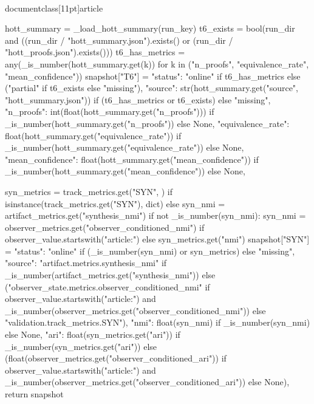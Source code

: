 \\documentclass[11pt]{article}
\begin{document}
\begin{CodeBlock}
{    hott_summary = _load_hott_summary(run_key)
    t6_exists = bool(run_dir and ((run_dir / "hott_summary.json").exists() or (run_dir / "hott_proofs.json").exists()))
    t6_has_metrics = any(_is_number(hott_summary.get(k)) for k in ("n_proofs", "equivalence_rate", "mean_confidence"))
    snapshot["T6"] = {
        "status": "online" if t6_has_metrics else ("partial" if t6_exists else "missing"),
        "source": str(hott_summary.get("source", "hott_summary.json")) if (t6_has_metrics or t6_exists) else "missing",
        "n_proofs": int(float(hott_summary.get("n_proofs"))) if _is_number(hott_summary.get("n_proofs")) else None,
        "equivalence_rate": float(hott_summary.get("equivalence_rate")) if _is_number(hott_summary.get("equivalence_rate")) else None,
        "mean_confidence": float(hott_summary.get("mean_confidence")) if _is_number(hott_summary.get("mean_confidence")) else None,
    }

    syn_metrics = track_metrics.get("SYN", {}) if isinstance(track_metrics.get("SYN"), dict) else {}
    syn_nmi = artifact_metrics.get("synthesis_nmi")
    if not _is_number(syn_nmi):
        syn_nmi = observer_metrics.get("observer_conditioned_nmi") if observer_value.startswith("article:") else syn_metrics.get("nmi")
    snapshot["SYN"] = {
        "status": "online" if (_is_number(syn_nmi) or syn_metrics) else "missing",
        "source": "artifact.metrics.synthesis_nmi" if _is_number(artifact_metrics.get("synthesis_nmi")) else ("observer_state.metrics.observer_conditioned_nmi" if observer_value.startswith("article:") and _is_number(observer_metrics.get("observer_conditioned_nmi")) else "validation.track_metrics.SYN"),
        "nmi": float(syn_nmi) if _is_number(syn_nmi) else None,
        "ari": float(syn_metrics.get("ari")) if _is_number(syn_metrics.get("ari")) else (float(observer_metrics.get("observer_conditioned_ari")) if observer_value.startswith("article:") and _is_number(observer_metrics.get("observer_conditioned_ari")) else None),
    }
    return snapshot


}
\end{CodeBlock}
\end{document}
